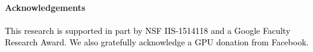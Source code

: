 \documentclass[runningheads]{llncs}
\newcommand{\boc}{\textcolor{black}}
\begin{document}






\vspace{-5pt}
\paragraph{Acknowledgements} \boc{This research is supported in part by NSF IIS-1514118 and a Google Faculty Research Award. We also gratefully acknowledge a GPU donation from Facebook.}

\clearpage













\end{document}
